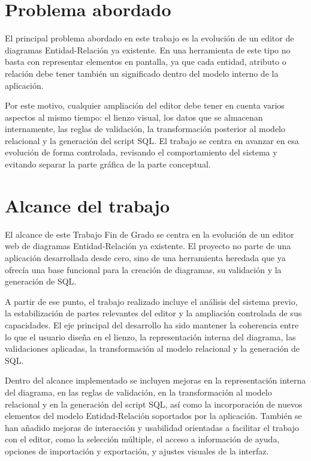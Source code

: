 

\section{Problema abordado}

El principal problema abordado en este trabajo es la evolución de un editor de diagramas Entidad-Relación ya existente. En una herramienta de este tipo no basta con representar elementos en pantalla, ya que cada entidad, atributo o relación debe tener también un significado dentro del modelo interno de la aplicación.

Por este motivo, cualquier ampliación del editor debe tener en cuenta varios aspectos al mismo tiempo: el lienzo visual, los datos que se almacenan internamente, las reglas de validación, la transformación posterior al modelo relacional y la generación del script SQL. El trabajo se centra en avanzar en esa evolución de forma controlada, revisando el comportamiento del sistema y evitando separar la parte gráfica de la parte conceptual.

\section{Alcance del trabajo}

El alcance de este Trabajo Fin de Grado se centra en la evolución de un editor web de diagramas Entidad-Relación ya existente. El proyecto no parte de una aplicación desarrollada desde cero, sino de una herramienta heredada que ya ofrecía una base funcional para la creación de diagramas, su validación y la generación de SQL.

A partir de ese punto, el trabajo realizado incluye el análisis del sistema previo, la estabilización de partes relevantes del editor y la ampliación controlada de sus capacidades. El eje principal del desarrollo ha sido mantener la coherencia entre lo que el usuario diseña en el lienzo, la representación interna del diagrama, las validaciones aplicadas, la transformación al modelo relacional y la generación de SQL.

Dentro del alcance implementado se incluyen mejoras en la representación interna del diagrama, en las reglas de validación, en la transformación al modelo relacional y en la generación del script SQL, así como la incorporación de nuevos elementos del modelo Entidad-Relación soportados por la aplicación. También se han añadido mejoras de interacción y usabilidad orientadas a facilitar el trabajo con el editor, como la selección múltiple, el acceso a información de ayuda, opciones de importación y exportación, y ajustes visuales de la interfaz.

